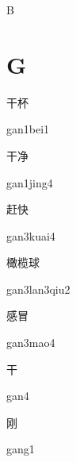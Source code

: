 B
﻿%
\section*{G}

\begin{verbete}{干杯}
\begin{pronuncia}{gan1bei1}
\end{pronuncia}
\end{verbete}

\begin{verbete}{干净}
\begin{pronuncia}{gan1jing4}
\end{pronuncia}
\end{verbete}

\begin{verbete}{赶快}
\begin{pronuncia}{gan3kuai4}
\end{pronuncia}
\end{verbete}

\begin{verbete}{橄榄球}
\begin{pronuncia}{gan3lan3qiu2}
\end{pronuncia}
\end{verbete}

\begin{verbete}{感冒}
\begin{pronuncia}{gan3mao4}
\end{pronuncia}
\end{verbete}

\begin{verbete}[gan4]{干}
\begin{pronuncia}{gan4}
\end{pronuncia}
\end{verbete}

\begin{verbete}[gang1]{刚}
\begin{pronuncia}{gang1}
\end{pronuncia}
\end{verbete}


